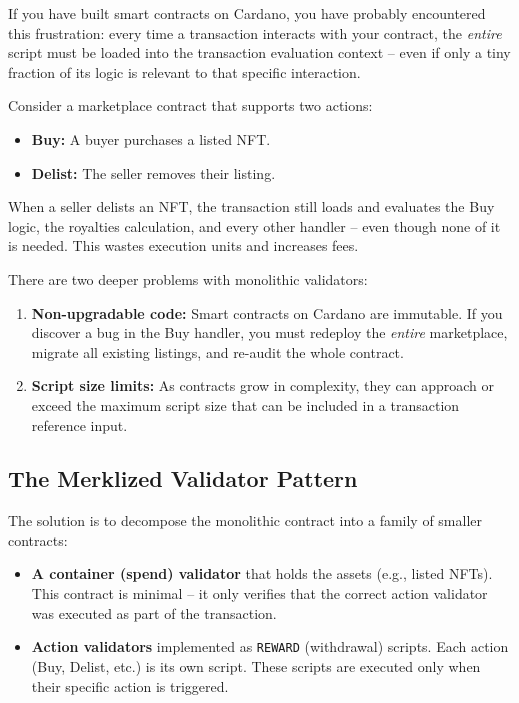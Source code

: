 If you have built smart contracts on Cardano, you have probably encountered this frustration: every time a transaction interacts with your contract, the \textit{entire} script must be loaded into the transaction evaluation context -- even if only a tiny fraction of its logic is relevant to that specific interaction.

Consider a marketplace contract that supports two actions:
\begin{itemize}
    \item \textbf{Buy:} A buyer purchases a listed NFT.
    \item \textbf{Delist:} The seller removes their listing.
\end{itemize}

When a seller delists an NFT, the transaction still loads and evaluates the Buy logic, the royalties calculation, and every other handler -- even though none of it is needed. This wastes execution units and increases fees.

There are two deeper problems with monolithic validators:

\begin{enumerate}
    \item \textbf{Non-upgradable code:} Smart contracts on Cardano are immutable. If you discover a bug in the Buy handler, you must redeploy the \textit{entire} marketplace, migrate all existing listings, and re-audit the whole contract.
    \item \textbf{Script size limits:} As contracts grow in complexity, they can approach or exceed the maximum script size that can be included in a transaction reference input.
\end{enumerate}

\subsection{The Merklized Validator Pattern}

The solution is to decompose the monolithic contract into a family of smaller contracts:

\begin{itemize}
    \item \textbf{A container (spend) validator} that holds the assets (e.g., listed NFTs). This contract is minimal -- it only verifies that the correct action validator was executed as part of the transaction.
    \item \textbf{Action validators} implemented as \texttt{REWARD} (withdrawal) scripts. Each action (Buy, Delist, etc.) is its own script. These scripts are executed only when their specific action is triggered.
\end{itemize}

